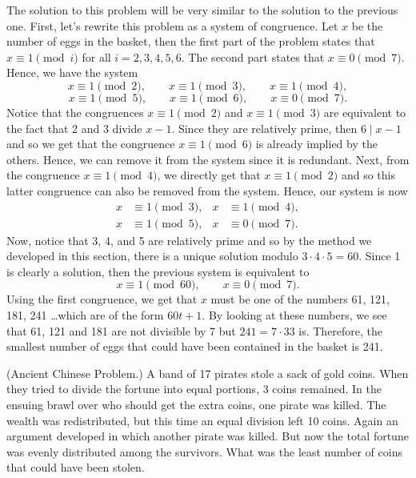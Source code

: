 \begin{solution}
    The solution to this problem will be very similar to the solution to the previous one. First, let's rewrite this problem as a system of congruence. Let $x$ be the number of eggs in the basket, then the first part of the problem states that $x \equiv 1 \pmod{i}$ for all $i = 2,3,4,5,6$. The second part states that $x \equiv 0 \pmod 7$. Hence, we have the system
    $$x \equiv 1 \pmod 2, \qquad x \equiv 1 \pmod 3, \qquad x \equiv 1 \pmod 4,$$
    $$x \equiv 1 \pmod 5, \qquad x \equiv 1 \pmod 6, \qquad x \equiv 0 \pmod 7.$$
    Notice that the congruences $x \equiv 1 \pmod 2$ and $x \equiv 1 \pmod 3$ are equivalent to the fact that 2 and 3 divide $x - 1$. Since they are relatively prime, then $6 \mid x - 1$ and so we get that the congruence $x \equiv 1 \pmod 6$ is already implied by the others. Hence, we can remove it from the system since it is redundant. Next, from the congruence $x \equiv 1 \pmod{4}$, we directly get that $x \equiv 1 \pmod 2$ and so this latter congruence can also be removed from the system. Hence, our system is now
    \begin{align*}
        x &\equiv 1 \pmod 3, & x &\equiv 1 \pmod 4, \\
        x &\equiv 1 \pmod 5, & x &\equiv 0 \pmod 7.
    \end{align*}
    Now, notice that 3, 4, and 5 are relatively prime and so by the method we developed in this section, there is a unique solution modulo $3 \cdot 4 \cdot 5 = 60$. Since 1 is clearly a solution, then the previous system is equivalent to
    $$x \equiv 1 \pmod{60}, \qquad x \equiv 0 \pmod 7.$$
    Using the first congruence, we get that $x$ must be one of the numbers 61, 121, 181, 241 \dots which are of the form $60t + 1$. By looking at these numbers, we see that 61, 121 and 181 are not divisible by 7 but $241 = 7 \cdot 33$ is. Therefore, the smallest number of eggs that could have been contained in the basket is 241. \\
\end{solution} 

\begin{exercise}
    (Ancient Chinese Problem.) A band of 17 pirates stole a sack of gold coins. When they tried to divide the fortune into equal portions, 3 coins remained. In the ensuing brawl over who should get the extra coins, one pirate was killed. The wealth was redistributed, but this time an equal division left 10 coins. Again an argument developed in which another pirate was killed. But now the total fortune was evenly distributed among the survivors. What was the least number of coins that could have been stolen. \\
\end{exercise}

